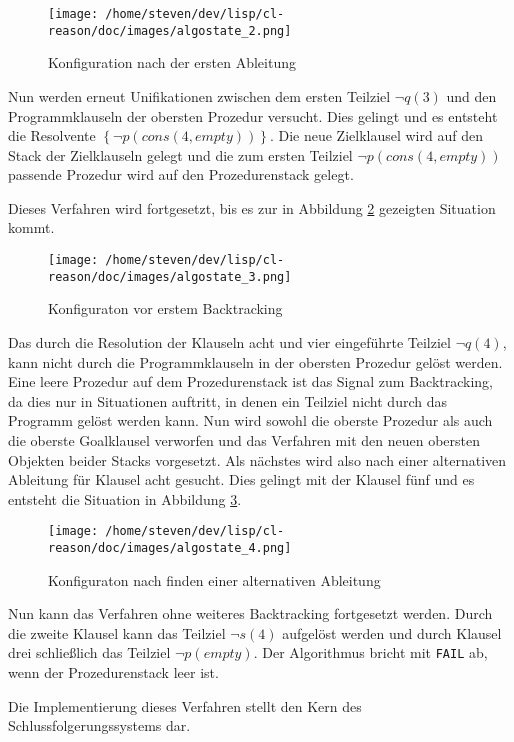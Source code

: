 \begin{figure} %
	\centering
		\texttt{[image: /home/steven/dev/lisp/cl-reason/doc/images/algostate\_2.png]}
	\caption{Konfiguration nach der ersten Ableitung}
	\label{algostate2}
\end{figure}

Nun werden erneut Unifikationen zwischen dem ersten Teilziel $\neg q(3)$ und den Programmklauseln der obersten Prozedur versucht. Dies gelingt und es entsteht die Resolvente $\left \{ \neg p(cons(4,empty))\right \}$. Die neue Zielklausel wird auf den Stack der Zielklauseln gelegt und die zum ersten Teilziel $\neg p(cons(4,empty))$ passende Prozedur wird auf den Prozedurenstack gelegt.

Dieses Verfahren wird fortgesetzt, bis es zur in Abbildung \ref{algostate3} gezeigten Situation kommt.

\begin{figure} %
	\centering
		\texttt{[image: /home/steven/dev/lisp/cl-reason/doc/images/algostate\_3.png]}
	\caption{Konfiguraton vor erstem Backtracking}
	\label{algostate3}
\end{figure}

Das durch die Resolution der Klauseln acht und vier eingeführte Teilziel $\neg q(4)$, kann nicht durch die Programmklauseln in der obersten Prozedur gelöst werden. Eine leere Prozedur auf dem Prozedurenstack ist das Signal zum Backtracking, da dies nur in Situationen auftritt, in denen ein Teilziel nicht durch das Programm gelöst werden kann. Nun wird sowohl die oberste Prozedur als auch die oberste Goalklausel verworfen und das Verfahren mit den neuen obersten Objekten beider Stacks vorgesetzt. Als nächstes wird also nach einer alternativen Ableitung für Klausel acht gesucht. Dies gelingt mit der Klausel fünf und es entsteht die Situation in Abbildung \ref{algostate4}.

\begin{figure} %
	\centering
		\texttt{[image: /home/steven/dev/lisp/cl-reason/doc/images/algostate\_4.png]}
	\caption{Konfiguraton nach finden einer alternativen Ableitung}
	\label{algostate4}
\end{figure}

Nun kann das Verfahren ohne weiteres Backtracking fortgesetzt werden. Durch die zweite Klausel kann das Teilziel $\neg s(4)$ aufgelöst werden und durch Klausel drei schließlich das Teilziel $\neg p(empty)$. Der Algorithmus bricht mit {\tt FAIL} ab, wenn der Prozedurenstack leer ist.

Die Implementierung dieses Verfahren stellt den Kern des Schlussfolgerungssystems dar.
